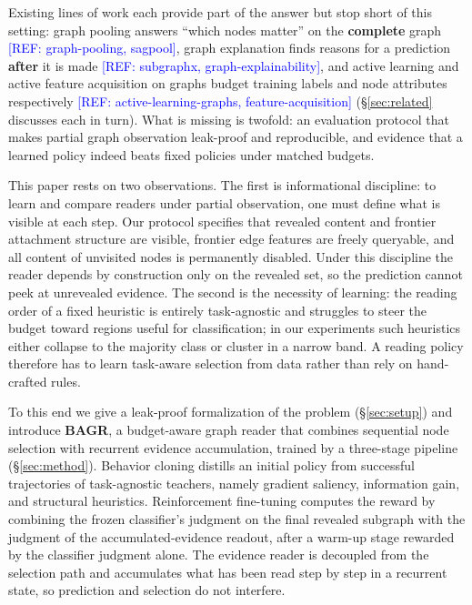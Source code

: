 \documentclass{article}
\newcommand{\refadd}[1]{\textcolor{blue}{[REF: #1]}}
\begin{document}
Existing lines of work each provide part of the answer but stop short of this setting: graph pooling answers ``which nodes matter'' on the \textbf{complete} graph \refadd{graph-pooling, sagpool}, graph explanation finds reasons for a prediction \textbf{after} it is made \refadd{subgraphx, graph-explainability}, and active learning and active feature acquisition on graphs budget training labels and node attributes respectively \refadd{active-learning-graphs, feature-acquisition} (\S\ref{sec:related} discusses each in turn). What is missing is twofold: an evaluation protocol that makes partial graph observation leak-proof and reproducible, and evidence that a learned policy indeed beats fixed policies under matched budgets.

This paper rests on two observations. The first is informational discipline: to learn and compare readers under partial observation, one must define what is visible at each step. Our protocol specifies that revealed content and frontier attachment structure are visible, frontier edge features are freely queryable, and all content of unvisited nodes is permanently disabled. Under this discipline the reader depends by construction only on the revealed set, so the prediction cannot peek at unrevealed evidence. The second is the necessity of learning: the reading order of a fixed heuristic is entirely task-agnostic and struggles to steer the budget toward regions useful for classification; in our experiments such heuristics either collapse to the majority class or cluster in a narrow band. A reading policy therefore has to learn task-aware selection from data rather than rely on hand-crafted rules.

To this end we give a leak-proof formalization of the problem (\S\ref{sec:setup}) and introduce \textbf{BAGR}, a budget-aware graph reader that combines sequential node selection with recurrent evidence accumulation, trained by a three-stage pipeline (\S\ref{sec:method}). Behavior cloning distills an initial policy from successful trajectories of task-agnostic teachers, namely gradient saliency, information gain, and structural heuristics. Reinforcement fine-tuning computes the reward by combining the frozen classifier's judgment on the final revealed subgraph with the judgment of the accumulated-evidence readout, after a warm-up stage rewarded by the classifier judgment alone. The evidence reader is decoupled from the selection path and accumulates what has been read step by step in a recurrent state, so prediction and selection do not interfere.
\end{document}
